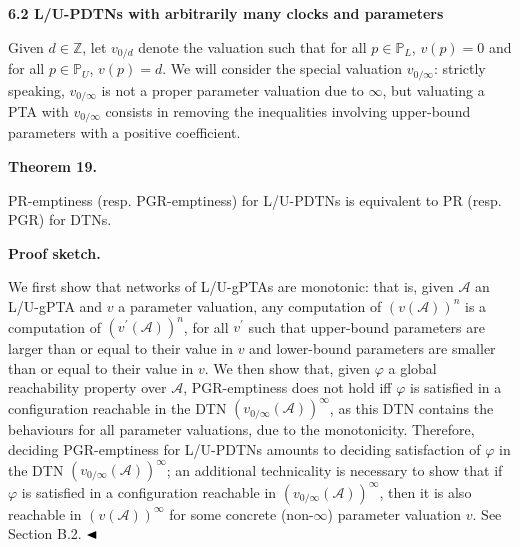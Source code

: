 \documentclass[10pt,a4paper]{article}
\begin{document}
 
 
\par\medskip\noindent\textbf{6.2 L/U-PDTNs with arbitrarily many clocks and parameters}\par
 
 
Given $d\in\mathbb{Z}$, let $v_{0/d}$ denote the valuation such that for all $p\in\mathbb{P}_{L}$, $v(p)=0$ and for all $p\in\mathbb{P}_{U}$, $v(p)=d$. We will consider the special valuation $v_{0/\infty}$: strictly speaking, $v_{0/\infty}$ is not a proper parameter valuation due to $\infty$, but valuating a PTA with $v_{0/\infty}$ consists in removing the inequalities involving upper-bound parameters with a positive coefficient.\par
 
 
 
\par\medskip\noindent\textbf{Theorem 19.}\par
 
 
PR-emptiness (resp. PGR-emptiness) for L/U-PDTNs is equivalent to PR (resp. PGR) for DTNs.\par
 
 
 
 
\par\medskip\noindent\textbf{Proof sketch.}\par
 
 
We first show that networks of L/U-gPTAs are monotonic: that is, given $\mathcal{A}$ an L/U-gPTA and $v$ a parameter valuation, any computation of ${(v(\mathcal{A}))}^{n}$ is a computation of ${(v^{\prime}(\mathcal{A}))}^{n}$, for all $v^{\prime}$ such that upper-bound parameters are larger than or equal to their value in $v$ and lower-bound parameters are smaller than or equal to their value in $v$. We then show that, given $\varphi$ a global reachability property over $\mathcal{A}$, PGR-emptiness does not hold iff $\varphi$ is satisfied in a configuration reachable in the DTN ${(v_{0/\infty}(\mathcal{A}))}^{\infty}$, as this DTN contains the behaviours for all parameter valuations, due to the monotonicity. Therefore, deciding PGR-emptiness for L/U-PDTNs amounts to deciding satisfaction of $\varphi$ in the DTN ${(v_{0/\infty}(\mathcal{A}))}^{\infty}$; an additional technicality is necessary to show that if $\varphi$ is satisfied in a configuration reachable in ${(v_{0/\infty}(\mathcal{A}))}^{\infty}$, then it is also reachable in ${(v(\mathcal{A}))}^{\infty}$ for some concrete (non-$\infty$) parameter valuation $v$. See Section B.2. $\hfill\blacktriangleleft$\par
 
\end{document}
